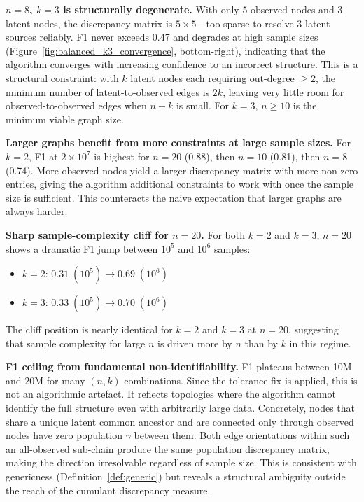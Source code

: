 \documentclass[11pt,a4paper]{article}
\numberwithin{equation}{section}
\begin{document}
\textbf{$n=8$, $k=3$ is structurally degenerate.}  With only 5 observed nodes and
3 latent nodes, the discrepancy matrix is $5 \times 5$---too sparse to resolve 3
latent sources reliably.  F1 never exceeds 0.47 and degrades at high sample sizes
(Figure~\ref{fig:balanced_k3_convergence}, bottom-right), indicating that the
algorithm converges with increasing confidence to an incorrect structure.  This is a
structural constraint: with $k$ latent nodes each requiring out-degree $\geq 2$, the
minimum number of latent-to-observed edges is $2k$, leaving very little room for
observed-to-observed edges when $n - k$ is small.  For $k=3$, $n \geq 10$ is the
minimum viable graph size.

\textbf{Larger graphs benefit from more constraints at large sample sizes.}  For
$k=2$, F1 at $2 \times 10^7$ is highest for $n=20$ (0.88), then $n=10$ (0.81),
then $n=8$ (0.74).  More observed nodes yield a larger discrepancy matrix with more
non-zero entries, giving the algorithm additional constraints to work with once the
sample size is sufficient.  This counteracts the naive expectation that larger graphs
are always harder.

\textbf{Sharp sample-complexity cliff for $n=20$.}  For both $k=2$ and $k=3$,
$n=20$ shows a dramatic F1 jump between $10^5$ and $10^6$ samples:
\begin{itemize}
  \item $k=2$: $0.31 \; (10^5) \to 0.69 \; (10^6)$
  \item $k=3$: $0.33 \; (10^5) \to 0.70 \; (10^6)$
\end{itemize}
The cliff position is nearly identical for $k=2$ and $k=3$ at $n=20$, suggesting
that sample complexity for large $n$ is driven more by $n$ than by $k$ in this regime.

\textbf{F1 ceiling from fundamental non-identifiability.}  F1 plateaus between 10M
and 20M for many $(n,k)$ combinations.  Since the tolerance fix is applied, this is
not an algorithmic artefact.  It reflects topologies where the algorithm cannot
identify the full structure even with arbitrarily large data.  Concretely, nodes that
share a unique latent common ancestor and are connected only through observed nodes
have zero population $\gamma$ between them.  Both edge orientations within such an
all-observed sub-chain produce the same population discrepancy matrix, making the
direction irresolvable regardless of sample size.  This is consistent with
genericness (Definition~\ref{def:generic}) but reveals a structural ambiguity outside
the reach of the cumulant discrepancy measure.
\end{document}
